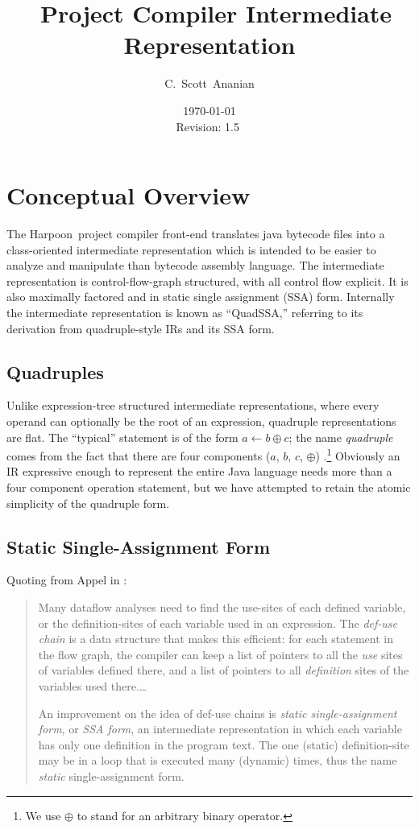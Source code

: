 \documentclass[11pt,notitlepage,twocolumn,twoside]{article}
\author{C.~Scott~Ananian}
\title{\Harpoon\ Project Compiler Intermediate Representation}
\date{\today \\ $ $Revision: 1.5 $ $}
\newcommand{\Harpoon}{Harpoon}%
\begin{document}

\maketitle

\section{Conceptual Overview}

The \Harpoon\ project compiler front-end translates java bytecode files
into a class-oriented intermediate representation which is intended to
be easier to analyze and manipulate than bytecode assembly language.
The intermediate representation is control-flow-graph structured, with
all control flow explicit.  It is also maximally factored and in
static single assignment (SSA) form.  Internally the intermediate
representation is known as ``QuadSSA,'' referring
to its derivation from quadruple-style IRs and its SSA form.

\subsection{Quadruples}
Unlike expression-tree structured intermediate representations, where
every operand can optionally be the root of an expression, quadruple
representations are flat.  The ``typical'' statement is of the form
$a \leftarrow b \oplus c$; the name \textit{quadruple} comes from the fact
that there are four components ($a$, $b$, $c$, $\oplus$)
\cite{appel:modern}.\footnote{We use $\oplus$ to stand for an arbitrary
binary operator.}  Obviously an IR expressive enough to represent the
entire Java language needs more than a four component operation
statement, but we have attempted to retain the atomic simplicity
of the quadruple form.

\subsection{Static Single-Assignment Form}

Quoting from Appel in \cite{appel:modern}:
\begin{quote}
Many dataflow analyses need to find the use-sites of each defined
variable, or the definition-sites of each variable used in an
expression.  The \textit{def-use chain} is a data structure that makes
this efficient: for each statement in the flow graph, the compiler can
keep a list of pointers to all the \textit{use} sites of variables
defined there, and a list of pointers to all \textit{definition} sites
of the variables used there.\ldots

An improvement on the idea of def-use chains is \textit{static
single-assignment form}, or \textit{SSA form}, an intermediate
representation in which each variable has only one definition in the
program text.  The one (static) definition-site may be in a loop that
is executed many (dynamic) times, thus the name \textit{static}
single-assignment form.
\end{quote}
\end{document}
